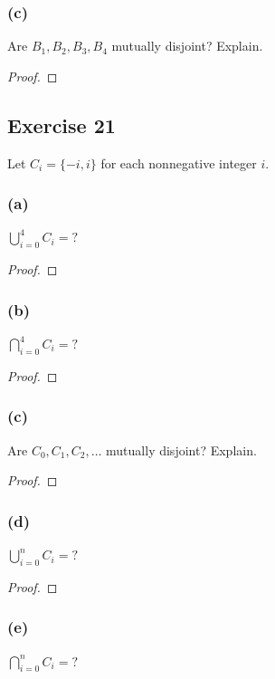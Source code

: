 \documentclass[14pt]{extarticle}
\newcommand{\dps}{\displaystyle}
\begin{document}
\subsubsection{(c)}
Are \(B_1, B_2, B_3, B_4\) mutually disjoint? Explain.

\begin{proof}

\end{proof}

\subsection{Exercise 21}
Let \(C_i = \{-i, i\}\) for each nonnegative integer $i$.

\subsubsection{(a)}
\(\dps \bigcup_{i=0}^{4}C_i = ?\)

\begin{proof}

\end{proof}

\subsubsection{(b)}
\(\dps \bigcap_{i=0}^{4}C_i = ?\)

\begin{proof}

\end{proof}

\subsubsection{(c)}
Are \(C_0, C_1, C_2, \ldots\) mutually disjoint? Explain.

\begin{proof}

\end{proof}

\subsubsection{(d)}
\(\dps \bigcup_{i=0}^{n}C_i = ?\)

\begin{proof}

\end{proof}

\subsubsection{(e)}
\(\dps \bigcap_{i=0}^{n}C_i = ?\)
\end{document}
